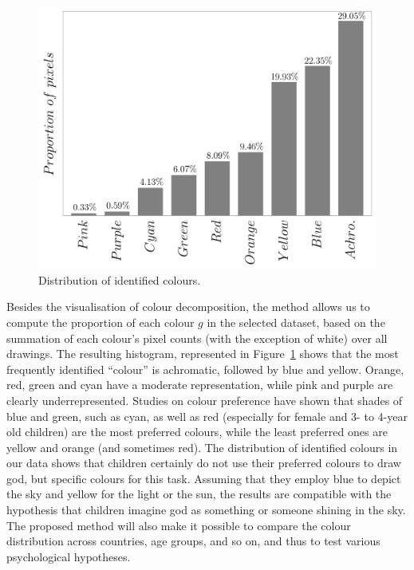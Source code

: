 \documentclass[11pt,a4paper]{article}
\begin{document}


\begin{figure}[h!]
	\centering
	\includegraphics[width=\linewidth]{figures/colors-barplot.png}
	\caption{Distribution of identified colours.}
	\label{fig:propcolours}
\end{figure}

Besides the visualisation of colour decomposition, the method allows us to compute the proportion of each colour $g$ in the selected dataset, based on the summation of each colour's pixel counts (with the exception of white) over all drawings. The resulting histogram, represented in Figure~\ref{fig:propcolours} shows that the most frequently identified ``colour'' is achromatic, followed by blue and yellow. Orange, red, green and cyan have a moderate representation, while pink and purple are clearly underrepresented. Studies on colour preference \cite[see e.g.][]{Granger1955,Zentner2001,JonauskaiteMohrAntoniettiEtAl2016} have shown that shades of blue and green, such as cyan, as well as red (especially for female and 3- to 4-year old children) are the most preferred colours, while the least preferred ones are yellow and orange (and sometimes red). The distribution of identified colours in our data shows that children certainly do not use their preferred colours to draw god, but specific colours for this task. Assuming that they employ blue to depict the sky and yellow for the light or the sun, the results are compatible with the hypothesis that children imagine god as something or someone shining in the sky. The proposed method will also make it possible to compare the colour distribution across countries, age groups, and so on, and thus to test various psychological hypotheses.
\end{document}
